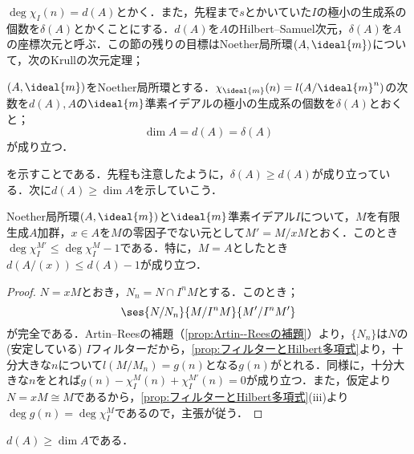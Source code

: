 $\deg\chi_I(n)=d(A)$とかく．また，先程まで$s$とかいていた$I$の極小の生成系の個数を$\delta(A)$とかくことにする．$d(A)$を$A$のHilbert--Samuel次元，$\delta(A)$を$A$の座標次元と呼ぶ．この節の残りの目標はNoether局所環$(A,\ideal{m})$について，次のKrullの次元定理；
\begin{thm}[Krullの次元定理]\label{thm:Krullの次元定理}
	$(A,\ideal{m})$をNoether局所環とする．$\chi_{\ideal{m}}(n)=l(A/\ideal{m}^n)$の次数を$d(A),A$の$\ideal{m}$準素イデアルの極小の生成系の個数を$\delta(A)$とおくと；
	\[\dim A=d(A)=\delta(A)\]
	が成り立つ．
\end{thm}

を示すことである．先程も注意したように，$\delta(A)\geq d(A)$が成り立っている．次に$d(A)\geq\dim A$を示していこう．

\begin{lem}\label{lem:商の特性多項式を上から抑える}
	Noether局所環$(A,\ideal{m})$と$\ideal{m}$準素イデアル$I$について，$M$を有限生成$A$加群，$x\in A$を$M$の零因子でない元として$M'=M/xM$とおく．このとき$\deg\chi_I^{M'}\leq\deg\chi_I^M-1$である．特に，$M=A$としたとき$d(A/(x))\leq d(A)-1$が成り立つ．
\end{lem}

\begin{proof}
	$N=xM$とおき，$N_n=N\cap I^nM$とする．このとき；
	\[\ses{N/N_n}{M/I^nM}{M'/I^nM'}\]
	が完全である．Artin--Reesの補題（\ref{prop:Artin--Reesの補題}）より，$\{N_n\}$は$N$の(安定している) $I$フィルターだから，\ref{prop:フィルターとHilbert多項式}より，十分大きな$n$について$l(M/M_n)=g(n)$となる$g(n)$がとれる．同様に，十分大きな$n$をとれば$g(n)-\chi_I^M(n)+\chi_I^{M'}(n)=0$が成り立つ．また，仮定より$N=xM\cong M$であるから，\ref{prop:フィルターとHilbert多項式}(iii)より$\deg g(n)=\deg\chi_I^M$であるので，主張が従う．
\end{proof}

\begin{prop}\label{prop:d(A)geq dim A}
	$d(A)\geq\dim A$である．
\end{prop}

